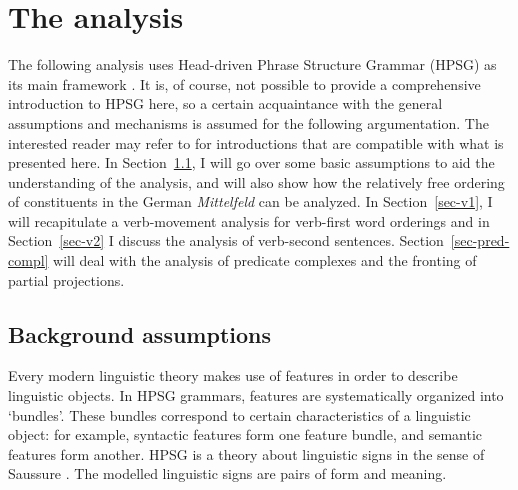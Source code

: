 \section{The analysis}
\label{sec-analysis-v1-v2}

The following analysis uses Head-driven Phrase Structure Grammar (HPSG) as its main framework \citep{ps2}. It is, of course,
not possible to provide a comprehensive introduction to HPSG here, so a certain acquaintance with the general assumptions and mechanisms is
assumed for the following argumentation. The interested reader may refer to
 for introductions that are
compatible with what is presented here. In Section~\ref{sec-annahmen}, I will go over some basic assumptions to aid the understanding of the analysis, and
will also show how the relatively free ordering of constituents in the German \emph{Mittelfeld} can be analyzed. In Section~\ref{sec-v1}, I will recapitulate a 
verb-movement analysis for verb-first word orderings and in Section~\ref{sec-v2} I discuss the analysis of verb-second sentences. Section~\ref{sec-pred-compl}
will deal with the analysis of predicate complexes and the fronting of partial projections.  


\subsection{Background assumptions}
\label{sec-annahmen}
\label{sec-scrambling-analysis}

Every modern linguistic theory makes use of features in order to describe linguistic objects. In HPSG grammars, features are
systematically organized into `bundles'. These bundles correspond to certain characteristics of a linguistic object: for example, syntactic features
form one feature bundle, and semantic features form another. HPSG is a theory about linguistic signs in the sense of Saussure \citeyearpar{Saussure16a}.
The modelled linguistic signs are pairs of form and meaning.

